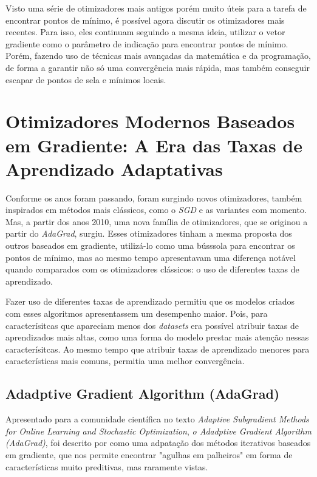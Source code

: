 Visto uma série de otimizadores mais antigos porém muito úteis para a tarefa de encontrar pontos de mínimo, é possível agora discutir os otimizadores mais recentes. Para isso, eles continuam seguindo a mesma ideia, utilizar o vetor gradiente como o parâmetro de indicação para encontrar pontos de mínimo. Porém, fazendo uso de técnicas mais avançadas da matemática e da programação, de forma a garantir não só uma convergência mais rápida, mas também conseguir escapar de pontos de sela e mínimos locais.

\section{Otimizadores Modernos Baseados em Gradiente: A Era das Taxas de Aprendizado Adaptativas}

Conforme os anos foram passando, foram surgindo novos otimizadores, também inspirados em métodos mais clássicos, como o \textit{SGD} e as variantes com momento. Mas, a partir dos anos 2010, uma nova família de otimizadores, que se originou a partir do \textit{AdaGrad}, surgiu. Esses otimizadores tinham a mesma proposta dos outros baseados em gradiente, utilizá-lo como uma bússsola para encontrar os pontos de mínimo, mas ao mesmo tempo apresentavam uma diferença notável quando comparados com os otimizadores clássicos: o uso de diferentes taxas de aprendizado.

Fazer uso de diferentes taxas de aprendizado permitiu que os modelos criados com esses algoritmos apresentassem um desempenho maior. Pois, para caracterísitcas que apareciam menos dos \textit{datasets} era possível atribuir taxas de aprendizados mais altas, como uma forma do modelo prestar mais atenção nessas caracterísitcas. Ao mesmo tempo que atribuir taxas de aprendizado menores para características mais comuns, permitia uma melhor convergência.

\subsection{Adadptive Gradient Algorithm (AdaGrad)} 

Apresentado para a comunidade científica no texto \textit{Adaptive Subgradient Methods for Online Learning and Stochastic Optimization}, \textit{o Adadptive Gradient Algorithm (AdaGrad)}, foi descrito por \textcite{AdaGradMethod} como uma adpatação dos métodos iterativos baseados em gradiente, que nos permite encontrar "agulhas em palheiros" em forma de características muito preditivas, mas raramente vistas.


